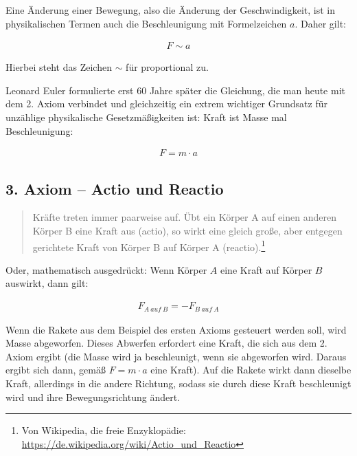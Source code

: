 \noindent Eine Änderung einer Bewegung, also die Änderung der Geschwindigkeit, ist in physikalischen Termen auch die \glqq Beschleunigung\grqq{} mit Formelzeichen $a$. Daher gilt:

\begin{align}
	F \sim a
\end{align}

\noindent Hierbei steht das Zeichen $\sim$ für \glqq proportional zu\grqq . 

Leonard Euler formulierte erst 60 Jahre später die Gleichung, die man heute mit dem 2. Axiom verbindet und gleichzeitig ein extrem wichtiger Grundsatz für unzählige physikalische Gesetzmäßigkeiten ist: \glqq Kraft ist Masse mal Beschleunigung\grqq :

\begin{align}	\label{eq:2.axiom}
	F = m \cdot a
\end{align}


\subsection{3. Axiom -- Actio und Reactio}

\begin{quote}
\glqq Kräfte treten immer paarweise auf. Übt ein Körper A auf einen anderen Körper B eine Kraft aus (actio), so wirkt eine gleich große, aber entgegen gerichtete Kraft von Körper B auf Körper A (reactio).\grqq \footnote{Von Wikipedia, die freie Enzyklopädie: \url{https://de.wikipedia.org/wiki/Actio_und_Reactio}}
\end{quote}

\noindent Oder, mathematisch ausgedrückt: Wenn Körper $A$ eine Kraft auf Körper $B$ auswirkt, dann gilt:

\begin{align}
	F_{A \ auf \ B} = -F_{B \ auf \ A}
\end{align}

\begin{Beispiel}
	Wenn die Rakete aus dem Beispiel des ersten Axioms gesteuert werden soll, wird Masse abgeworfen. Dieses Abwerfen erfordert eine Kraft, die sich aus dem 2. Axiom ergibt (die Masse wird ja beschleunigt, wenn sie abgeworfen wird. Daraus ergibt sich dann, gemäß $F=m \cdot a$ eine Kraft). Auf die Rakete wirkt dann dieselbe Kraft, allerdings in die andere Richtung, sodass sie durch diese Kraft beschleunigt wird und ihre Bewegungsrichtung ändert.
\end{Beispiel}






